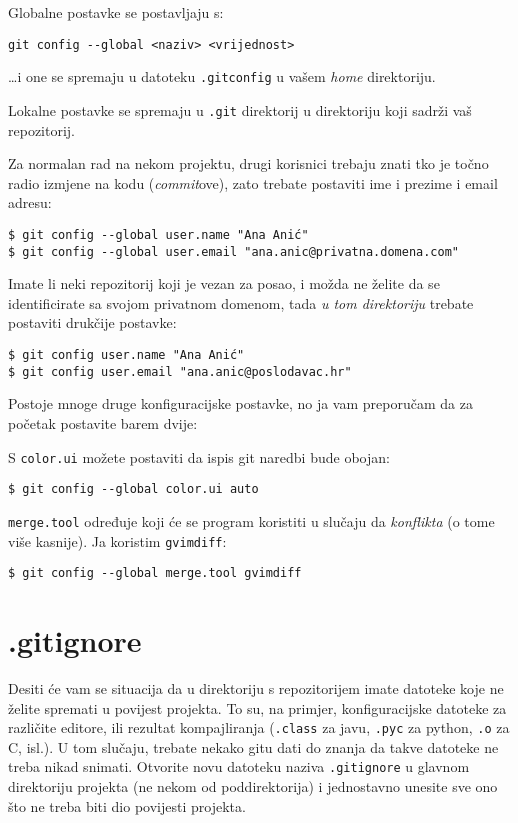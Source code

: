 Globalne postavke se postavljaju s:

\begin{verbatim}
git config --global <naziv> <vrijednost>
\end{verbatim}

\dots{}i one se spremaju u datoteku \verb+.gitconfig+ u vašem \emph{home} direktoriju.

Lokalne postavke se spremaju u \verb+.git+ direktorij u direktoriju koji sadrži vaš repozitorij.

Za normalan rad na nekom projektu, drugi korisnici trebaju znati tko je točno radio izmjene na kodu (\emph{commit}ove), zato trebate postaviti ime i prezime i email adresu:

\begin{verbatim}
$ git config --global user.name "Ana Anić"
$ git config --global user.email "ana.anic@privatna.domena.com"
\end{verbatim}

Imate li neki repozitorij koji je vezan za posao, i možda ne želite da se identificirate sa svojom privatnom domenom, tada \emph{u tom direktoriju} trebate postaviti drukčije postavke:

\begin{verbatim}
$ git config user.name "Ana Anić"
$ git config user.email "ana.anic@poslodavac.hr"
\end{verbatim}

Postoje mnoge druge konfiguracijske postavke, no ja vam preporučam da za početak postavite barem dvije:

S \verb+color.ui+ možete postaviti da ispis git naredbi bude obojan:

\begin{verbatim}
$ git config --global color.ui auto
\end{verbatim}

\verb+merge.tool+ određuje koji će se program koristiti u slučaju da \emph{konflikta} (o tome više kasnije). Ja koristim \verb+gvimdiff+:

\begin{verbatim}
$ git config --global merge.tool gvimdiff
\end{verbatim}

\section*{.gitignore}

Desiti će vam se situacija da u direktoriju s repozitorijem imate datoteke koje ne želite spremati u povijest projekta.
To su, na primjer, konfiguracijske datoteke za različite editore, ili rezultat kompajliranja (\verb+.class+ za javu, \verb+.pyc+ za python, \verb+.o+ za C, isl.).
U tom slučaju, trebate nekako gitu dati do znanja da takve datoteke ne treba nikad snimati.
Otvorite novu datoteku naziva \verb+.gitignore+ u glavnom direktoriju projekta (ne nekom od poddirektorija) i jednostavno unesite sve ono što ne treba biti dio povijesti projekta.

